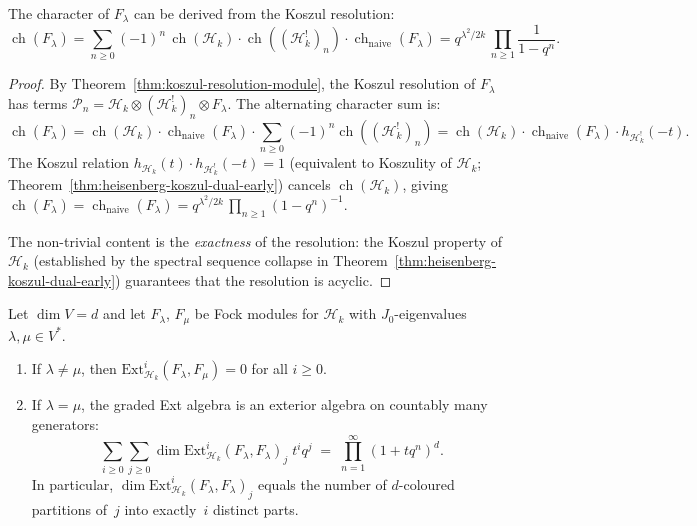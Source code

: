 \begin{corollary}
\label{cor:fock-character-koszul}
The character of $F_\lambda$ can be derived from the Koszul resolution:
\begin{equation}
\operatorname{ch}(F_\lambda)
= \sum_{n \geq 0} (-1)^n\,
 \operatorname{ch}(\mathcal{H}_k) \cdot
 \operatorname{ch}((\mathcal{H}_k^!)_n) \cdot
 \operatorname{ch}_{\mathrm{naive}}(F_\lambda)
= q^{\lambda^2/2k}\,\prod_{n \geq 1}\frac{1}{1-q^n}.
\end{equation}
\end{corollary}

\begin{proof}
By Theorem~\ref{thm:koszul-resolution-module},
the Koszul resolution of $F_\lambda$ has terms
$\mathcal{P}_n = \mathcal{H}_k \otimes (\mathcal{H}_k^!)_n
\otimes F_\lambda$. The alternating character sum is:
\[
\operatorname{ch}(F_\lambda)
= \operatorname{ch}(\mathcal{H}_k) \cdot
 \operatorname{ch}_{\mathrm{naive}}(F_\lambda) \cdot
 \sum_{n \geq 0} (-1)^n \operatorname{ch}((\mathcal{H}_k^!)_n)
= \operatorname{ch}(\mathcal{H}_k) \cdot
 \operatorname{ch}_{\mathrm{naive}}(F_\lambda) \cdot
 h_{\mathcal{H}_k^!}(-t).
\]
The Koszul relation $h_{\mathcal{H}_k}(t) \cdot
h_{\mathcal{H}_k^!}(-t) = 1$
(equivalent to Koszulity of $\mathcal{H}_k$;
Theorem~\ref{thm:heisenberg-koszul-dual-early}) cancels
$\operatorname{ch}(\mathcal{H}_k)$, giving
$\operatorname{ch}(F_\lambda) =
\operatorname{ch}_{\mathrm{naive}}(F_\lambda)
= q^{\lambda^2/2k}\,\prod_{n \geq 1}(1-q^n)^{-1}$.

The non-trivial content is the \emph{exactness} of the resolution: the
Koszul property of $\mathcal{H}_k$ (established by the spectral
sequence collapse in Theorem~\ref{thm:heisenberg-koszul-dual-early})
guarantees that the resolution is acyclic.
\end{proof}

\begin{proposition}
\label{prop:fock-ext}
Let $\dim V = d$ and let $F_\lambda$, $F_\mu$ be Fock modules for
$\mathcal{H}_k$ with $J_0$-eigenvalues $\lambda, \mu \in V^*$.
\begin{enumerate}[label=\textup{(\roman*)}]
\item If $\lambda \neq \mu$, then
$\mathrm{Ext}^i_{\mathcal{H}_k}(F_\lambda, F_\mu) = 0$
for all $i \geq 0$.
\item If $\lambda = \mu$, the graded Ext algebra is an exterior
algebra on countably many generators:
\begin{equation}\label{eq:fock-ext-generating}
\sum_{i \geq 0} \sum_{j \geq 0}
\dim \mathrm{Ext}^i_{\mathcal{H}_k}(F_\lambda, F_\lambda)_j
\; t^i q^j
\;=\; \prod_{n=1}^{\infty}(1 + tq^n)^d.
\end{equation}
In particular,
$\dim \mathrm{Ext}^i_{\mathcal{H}_k}(F_\lambda, F_\lambda)_j$
equals the number of $d$-coloured partitions of~$j$ into exactly~$i$
distinct parts.
\end{enumerate}
\end{proposition}


